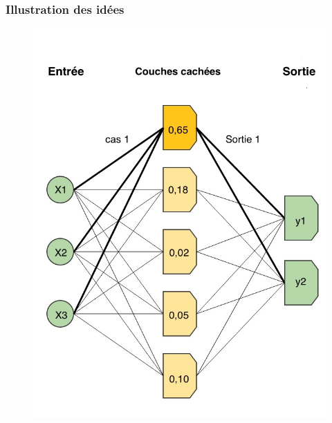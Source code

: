 \documentclass{beamer}
\begin{document}
\begin{frame}
	\frametitle{Illustration des idées}
	\begin{figure}[t]
		\includegraphics[scale=0.23]{NN illu}
	\end{figure}
\end{frame}
\end{document}
